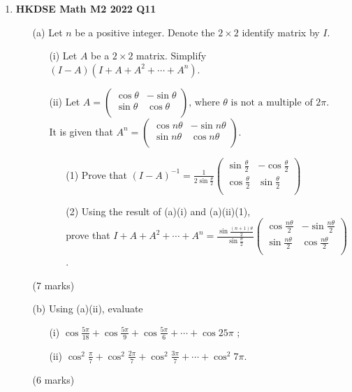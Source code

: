 \documentclass[12pt]{article}
\begin{document}
\begin{enumerate}
	\item \textbf{HKDSE Math M2 2022 Q11}
	\begin{enumerate}
		\item [(a)] Let $n$ be a positive integer. Denote the $2\times2$ identify matrix by $I$. 
		\begin{enumerate}
			\item [(i)] Let $A$ be a $2\times2$ matrix. Simplify $(I - A)(I + A + A^2 + \cdots + A^n)$.
			\item [(ii)]Let $A = 
				\begin{pmatrix}
				\cos{\theta}&-\sin{\theta}\\
				\sin{\theta}&\cos{\theta}\\
				\end{pmatrix} \text{, 
				where } \theta \text{ is not a multiple of } 2\pi$.\\
				It is given that $A^n = 
				\begin{pmatrix}
				\cos{n\theta}&-\sin{n\theta}\\
				\sin{n\theta}&\cos{n\theta}\\
				\end{pmatrix}$. 
			\begin{enumerate}
				\item [(1)] Prove that $\displaystyle(I - A) ^{-1} = \frac{1}{2\sin{\displaystyle\frac{\theta}{2}}} 
					\begin{pmatrix}
						\sin{\displaystyle\frac{\theta}{2}}&-\cos{\displaystyle\frac{\theta}{2}}\\
						\cos{\displaystyle\frac{\theta}{2}}&\sin{\displaystyle\frac{\theta}{2}}\\
					\end{pmatrix}$
				\item[(2)] Using the result of (a)(i) and (a)(ii)(1),\\prove that $I+A+A^2+\cdots+A^n = \displaystyle\frac{\sin{\displaystyle\frac{(n+1)\theta}{2}}}{\sin{\displaystyle\frac{\theta}{2}}}
					\begin{pmatrix}
						\cos{\displaystyle\frac{n\theta}{2}}&-\sin{\displaystyle\frac{n\theta}{2}}\\
						\sin{\displaystyle\frac{n\theta}{2}}&\cos{\displaystyle\frac{n\theta}{2}}\\
					\end{pmatrix}$ . 
			\end{enumerate}
		\end{enumerate}
		(7 marks)
		\item[(b)]Using (a)(ii), evaluate
		\begin{enumerate}
			\item [(i)]$\cos{\displaystyle\frac{5\pi}{18}}+\cos{\displaystyle\frac{5\pi}{9}}+\cos{\displaystyle\frac{5\pi}{6}}+\cdots+\cos{25\pi}$ ; 
			\item [(ii)]$\cos^2{\displaystyle\frac{\pi}{7}}+\cos^2{\displaystyle\frac{2\pi}{7}}+\cos^2{\displaystyle\frac{3\pi}{7}}+\cdots+\cos^2{7\pi}$. 
		\end{enumerate}
	(6 marks)
	\end{enumerate}



\end{enumerate}
\end{document}
